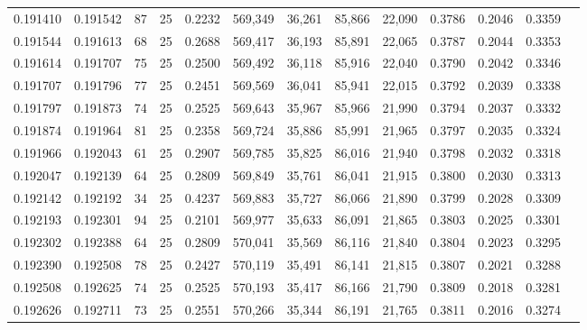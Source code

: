 \begin{tabular}{rrrrrrrrrrrrr}
0.191410 & 0.191542 &  87 &  25 &                                     0.2232 & 569,349 &  36,261 &  85,866 &  22,090 & 0.3786 & 0.2046 & 0.3359 \\
0.191544 & 0.191613 &  68 &  25 &                                     0.2688 & 569,417 &  36,193 &  85,891 &  22,065 & 0.3787 & 0.2044 & 0.3353 \\
0.191614 & 0.191707 &  75 &  25 &                                     0.2500 & 569,492 &  36,118 &  85,916 &  22,040 & 0.3790 & 0.2042 & 0.3346 \\
0.191707 & 0.191796 &  77 &  25 &                                     0.2451 & 569,569 &  36,041 &  85,941 &  22,015 & 0.3792 & 0.2039 & 0.3338 \\
0.191797 & 0.191873 &  74 &  25 &                                     0.2525 & 569,643 &  35,967 &  85,966 &  21,990 & 0.3794 & 0.2037 & 0.3332 \\
0.191874 & 0.191964 &  81 &  25 &                                     0.2358 & 569,724 &  35,886 &  85,991 &  21,965 & 0.3797 & 0.2035 & 0.3324 \\
0.191966 & 0.192043 &  61 &  25 &                                     0.2907 & 569,785 &  35,825 &  86,016 &  21,940 & 0.3798 & 0.2032 & 0.3318 \\
0.192047 & 0.192139 &  64 &  25 &                                     0.2809 & 569,849 &  35,761 &  86,041 &  21,915 & 0.3800 & 0.2030 & 0.3313 \\
0.192142 & 0.192192 &  34 &  25 &                                     0.4237 & 569,883 &  35,727 &  86,066 &  21,890 & 0.3799 & 0.2028 & 0.3309 \\
0.192193 & 0.192301 &  94 &  25 &                                     0.2101 & 569,977 &  35,633 &  86,091 &  21,865 & 0.3803 & 0.2025 & 0.3301 \\
0.192302 & 0.192388 &  64 &  25 &                                     0.2809 & 570,041 &  35,569 &  86,116 &  21,840 & 0.3804 & 0.2023 & 0.3295 \\
0.192390 & 0.192508 &  78 &  25 &                                     0.2427 & 570,119 &  35,491 &  86,141 &  21,815 & 0.3807 & 0.2021 & 0.3288 \\
0.192508 & 0.192625 &  74 &  25 &                                     0.2525 & 570,193 &  35,417 &  86,166 &  21,790 & 0.3809 & 0.2018 & 0.3281 \\
0.192626 & 0.192711 &  73 &  25 &                                     0.2551 & 570,266 &  35,344 &  86,191 &  21,765 & 0.3811 & 0.2016 & 0.3274 \\

\end{tabular}
